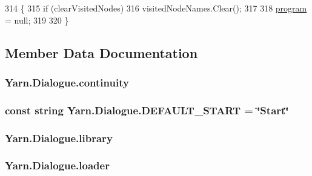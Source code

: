 \begin{DoxyCode}
314                                                              \{
315             \textcolor{keywordflow}{if} (clearVisitedNodes)
316                 visitedNodeNames.Clear();
317 
318             \hyperlink{a00050_a0a1cca92325f430425d784d416cb5c2b}{program} = null;
319 
320         \}
\end{DoxyCode}


\subsection{Member Data Documentation}
\hypertarget{a00050_ae94eaa4b03b432422f5d205fabe37ff5}{
\subsubsection[{continuity}]{ Yarn.\-Dialogue.\-continuity\hspace{0.3cm}{\ttfamily [package]}}}\label{a00050_ae94eaa4b03b432422f5d205fabe37ff5}
\hypertarget{a00050_a1b643f15f734090e6a58cbf13dafd28f}{
\subsubsection[{D\-E\-F\-A\-U\-L\-T\-\_\-\-S\-T\-A\-R\-T}]{\setlength{\rightskip}{0pt plus 5cm}const string Yarn.\-Dialogue.\-D\-E\-F\-A\-U\-L\-T\-\_\-\-S\-T\-A\-R\-T = \char`\"{}Start\char`\"{}}}\label{a00050_a1b643f15f734090e6a58cbf13dafd28f}
\hypertarget{a00050_ae660d4cfb6e296358d2f61d8ee74c66a}{
\subsubsection[{library}]{ Yarn.\-Dialogue.\-library}}\label{a00050_ae660d4cfb6e296358d2f61d8ee74c66a}
\hypertarget{a00050_a98bbe0ac2ccadeeeb7e05e3e6e19f2e0}{
\subsubsection[{loader}]{ Yarn.\-Dialogue.\-loader\hspace{0.3cm}{\ttfamily [private]}}}\label{a00050_a98bbe0ac2ccadeeeb7e05e3e6e19f2e0}
